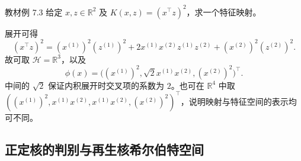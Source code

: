 \begin{example}
\label{ex:lihang-svm-quadratic-kernel}
教材例 7.3 给定 $x,z\in\mathbb R^2$ 及 $K(x,z)=(x^\top z)^2$，求一个特征映射。
\end{example}
\begin{solve}
展开可得
\[
  (x^\top z)^2=(x^{(1)})^2(z^{(1)})^2
       +2x^{(1)}x^{(2)}z^{(1)}z^{(2)}
       +(x^{(2)})^2(z^{(2)})^2.
\]
故可取 $\mathcal H=\mathbb R^3$，以及
\[
  \phi(x)=\bigl((x^{(1)})^2,\sqrt2x^{(1)}x^{(2)},(x^{(2)})^2\bigr)^\top.
\]
中间的 $\sqrt2$ 保证内积展开时交叉项的系数为 $2$。也可在 $\mathbb R^4$ 中取 $((x^{(1)})^2,x^{(1)}x^{(2)},x^{(1)}x^{(2)},(x^{(2)})^2)^\top$，说明映射与特征空间的表示均可不同。
\end{solve}

\subsection{正定核的判别与再生核希尔伯特空间}
\label{subsec:lihang-svm-psd-kernel}


